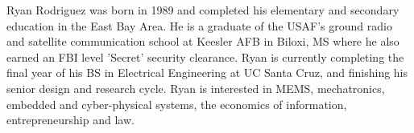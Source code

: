 \documentclass[journal, draftcls]{IEEEtran}
\begin{document}
\begin{IEEEbiography}
{Ryan Rodriguez} was born in 1989 and completed his elementary and secondary education in the East Bay Area. He is a graduate of the USAF's ground radio and satellite communication school at Keesler AFB in Biloxi, MS where he also earned an FBI level 'Secret' security clearance. Ryan is currently completing the final year of his BS in Electrical Engineering at UC Santa Cruz, and finishing his senior design and research cycle. Ryan is interested in MEMS, mechatronics, embedded and cyber-physical systems, the economics of information, entrepreneurship and law. 
\end{IEEEbiography}
\end{document}
